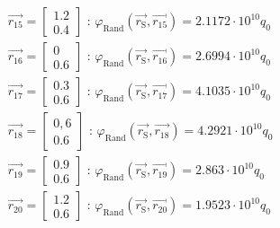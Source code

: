 \documentclass[Protokollheft.tex]{subfiles}
\begin{document}
\begin{eqnarray}
\vec{r_{15}}=\begin{bmatrix}
1.2 \\
0.4    
\end{bmatrix} \text{ :       }\varphi_\text{Rand}(\vec{r_\text{S}},\vec{r_{15}})= 2.1172 \cdot 10^{10}q_0\\
\vec{r_{16}}=\begin{bmatrix}
0 \\
0.6    
\end{bmatrix} \text{ :       }\varphi_\text{Rand}(\vec{r_\text{S}},\vec{r_{16}})= 2.6994 \cdot 10^{10}q_0\\
\vec{r_{17}}=\begin{bmatrix}
0.3 \\
0.6    
\end{bmatrix} \text{ :       }\varphi_\text{Rand}(\vec{r_\text{S}},\vec{r_{17}})= 4.1035 \cdot 10^{10}q_0\\
\vec{r_{18}}=\begin{bmatrix}
0,6 \\
0.6    
\end{bmatrix} \text{ :       }\varphi_\text{Rand}(\vec{r_\text{S}},\vec{r_{18}})= 4.2921 \cdot 10^{10}q_0\\
\vec{r_{19}}=\begin{bmatrix}
0.9 \\
0.6    
\end{bmatrix} \text{ :       }\varphi_\text{Rand}(\vec{r_\text{S}},\vec{r_{19}})= 2.863 \cdot 10^{10}q_0\\
\vec{r_{20}}=\begin{bmatrix}
1.2 \\
0.6    
\end{bmatrix} \text{ :       }\varphi_\text{Rand}(\vec{r_\text{S}},\vec{r_{20}})= 1.9523 \cdot 10^{10}q_0
\end{eqnarray} 
\end{document}
